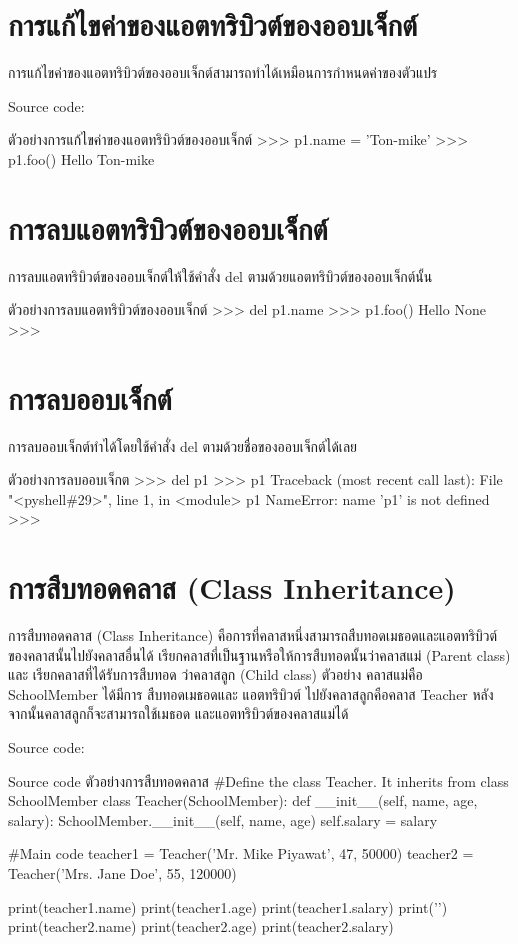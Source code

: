 \section{การแก้ไขค่าของแอตทริบิวต์ของออบเจ็กต์}

การแก้ไขค่าของแอตทริบิวต์ของออบเจ็กต์สามารถทำได้เหมือนการกำหนดค่าของตัวแปร

Source code:
\begin{codelist}{ตัวอย่างการแก้ไขค่าของแอตทริบิวต์ของออบเจ็กต์}{}
>>> p1.name = 'Ton-mike'
>>> p1.foo()
Hello Ton-mike
\end{codelist}


\section{การลบแอตทริบิวต์ของออบเจ็กต์}

การลบแอตทริบิวต์ของออบเจ็กต์ให้ใช้คำสั่ง del ตามด้วยแอตทริบิวต์ของออบเจ็กต์นั้น
\begin{codelist}{ตัวอย่างการลบแอตทริบิวต์ของออบเจ็กต์}{}
>>> del p1.name
>>> p1.foo()
Hello None
>>> 
\end{codelist}

\section{การลบออบเจ็กต์}

การลบออบเจ็กต์ทำได้โดยใช้คำสั่ง del ตามด้วยชื่อของออบเจ็กต์ได้เลย

\begin{codelist}{ตัวอย่างการลบออบเจ็กต}{}
>>> del p1
>>> p1
Traceback (most recent call last):
  File "<pyshell\#29>", line 1, in <module>
    p1
NameError: name 'p1' is not defined
>>> 
\end{codelist}

\section{การสืบทอดคลาส (Class Inheritance)}
การสืบทอดคลาส (Class Inheritance) คือการที่คลาสหนึ่งสามารถสืบทอดเมธอดและแอตทริบิวต์ ของคลาสนั้นไปยังคลาสอื่นได้ เรียกคลาสที่เป็นฐานหรือให้การสืบทอดนั้นว่าคลาสแม่ (Parent class) และ เรียกคลาสที่ได้รับการสืบทอด ว่าคลาสลูก (Child class) ตัวอย่าง คลาสแม่คือ SchoolMember ได้มีการ สืบทอดเมธอดและ แอตทริบิวต์ ไปยังคลาสลูกคือคลาส Teacher หลังจากนั้นคลาสลูกก็จะสามารถใช้เมธอด และแอตทริบิวต์ของคลาสแม่ได้

Source code:
\begin{codelist}{Source code ตัวอย่างการสืบทอดคลาส}{}
#Define the class Teacher. It inherits from class SchoolMember
class Teacher(SchoolMember):
    def __init__(self, name, age, salary):
        SchoolMember.__init__(self, name, age)
        self.salary = salary

#Main code
teacher1 = Teacher('Mr. Mike Piyawat', 47, 50000)
teacher2 = Teacher('Mrs. Jane Doe', 55, 120000)

print(teacher1.name)
print(teacher1.age)
print(teacher1.salary)
print('\n')
print(teacher2.name)
print(teacher2.age)
print(teacher2.salary)
\end{codelist}

